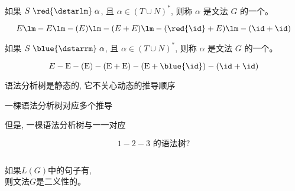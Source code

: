 \begin{frame}{}
  \begin{definition}
    如果 $S \;\red{\dstarlm}\; \alpha$, 且 $\alpha \in (T \cup N)^{\ast}$,
    则称 $\alpha$ 是文法 $G$ 的一个。
  \end{definition}

  \[
    E \lm -E \lm -(E) \lm -(E + E) \lm -(\red{\id} + E) \lm -(\id + \id)
  \]

  \pause
  \begin{definition}
    如果 $S \;\blue{\dstarrm}\; \alpha$, 且 $\alpha \in (T \cup N)^{\ast}$,
    则称 $\alpha$ 是文法 $G$ 的一个。
  \end{definition}

  \[
    E \rm -E \rm -(E) \rm -(E + E) \rm -(E + \blue{\id}) \rm -(\id + \id)
  \]
\end{frame}

\begin{frame}{}
  \begin{center}

    \vspace{0.30cm}
    语法分析树是静态的, 它不关心动态的推导顺序


    一棵语法分析树对应多个推导

    \pause
    \vspace{0.30cm}
    但是, 一棵语法分析树与一一对应
  \end{center}
\end{frame}

\begin{frame}{}
  

  \[
    1 - 2 - 3 \text{ 的语法树?}
  \]

  \pause
  \begin{columns}
      \pause
  \end{columns}

  \pause
  \vspace{0.30cm}
  \begin{definition}
    如果$L(G)$中的句子有, \\[5pt]
    则文法$G$是二义性的。
  \end{definition}
\end{frame}

